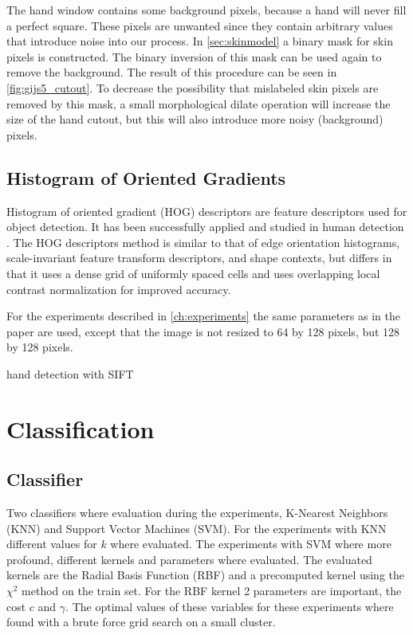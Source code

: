 The hand window contains some background pixels, because a hand will never fill a perfect square. These pixels are unwanted since they contain arbitrary values that introduce noise into our process. In \autoref{sec:skinmodel} a binary mask for skin pixels is constructed. The binary inversion of this mask can be used again to remove the background. The result of this procedure can be seen in \autoref{fig:gijs5_cutout}. To decrease the possibility that mislabeled skin pixels are removed by this mask, a small morphological dilate operation will increase the size of the hand cutout, but this will also introduce more noisy (background) pixels.


\subsection*{Histogram of Oriented Gradients}
Histogram of oriented gradient (HOG) descriptors are feature descriptors used for object detection. It has been successfully applied and studied in human detection \cite{NavneetDalal2006}.  The HOG descriptors method is similar to that of edge orientation histograms, scale-invariant feature transform descriptors, and shape contexts, but differs in that it uses a dense grid of uniformly spaced cells and uses overlapping local contrast normalization for improved accuracy.

For the experiments described in \autoref{ch:experiments} the same parameters as in the \cite{watanabe2009} paper are used, except that the image is not resized to 64 by 128 pixels, but 128 by 128 pixels.

hand detection with SIFT\cite{Wang2007}

\section{Classification}

\subsection*{Classifier}
Two classifiers where evaluation during the experiments, K-Nearest Neighbors (KNN) and Support Vector Machines (SVM). For the experiments with KNN different values for $k$ where evaluated. The experiments with SVM where more profound, different kernels and parameters where evaluated. The evaluated kernels are the Radial Basis Function (RBF) and a precomputed kernel using the $\chi^2$ method on the train set. For the RBF kernel 2 parameters are important, the cost $c$ and $\gamma$. The optimal values of these variables for these experiments where found with a brute force grid search on a small cluster.

